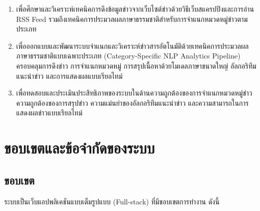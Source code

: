 \begin{enumerate}[label=\arabic*)]
    \item เพื่อศึกษาและวิเคราะห์เทคนิคการดึงข้อมูลข่าวจากเว็บไซต์ข่าวด้วยวิธีเว็บสแครปปิงและการอ่าน RSS Feed รวมถึงเทคนิคการประมวลผลภาษาธรรมชาติสำหรับการจำแนกหมวดหมู่ข่าวตามประเภท
    \item เพื่อออกแบบและพัฒนาระบบจำแนกและวิเคราะห์ข่าวสารอัตโนมัติด้วยเทคนิคการประมวลผลภาษาธรรมชาติแบบเฉพาะประเภท (Category-Specific NLP Analytics Pipeline) ครอบคลุมการดึงข่าว การจำแนกหมวดหมู่ การสรุปเนื้อหาด้วยโมเดลภาษาขนาดใหญ่ อัลกอริทึมแนะนำข่าว และการแสดงผลแบบเรียลไทม์
    \item เพื่อทดสอบและประเมินประสิทธิภาพของระบบในด้านความถูกต้องของการจำแนกหมวดหมู่ข่าว ความถูกต้องของการสรุปข่าว ความแม่นยำของอัลกอริทึมแนะนำข่าว และความสามารถในการแสดงผลข่าวแบบเรียลไทม์
\end{enumerate}

\section{ขอบเขตและข้อจำกัดของระบบ}

\subsection{ขอบเขต}

ระบบเป็นเว็บแอปพลิเคชันแบบเต็มรูปแบบ (Full-stack) ที่มีขอบเขตการทำงาน ดังนี้

